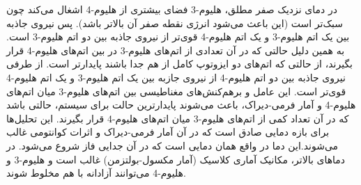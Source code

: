 \documentclass[12pt,a4paper]{article}
\begin{document}
	در دمای نزدیک صفر مطلق، هلیوم-3 فضای بیشتری از هلیوم-4 اشغال می‌کند چون سبک‌تر است (این باعث می‌شود انرژی نقطه صفر آن بالاتر باشد).
	پس نیروی جاذبه بین یک اتم هلیوم-3 و یک اتم هلیوم-4 قوی‌تر از نیروی جاذبه بین دو اتم هلیوم-3 است.
	به همین دلیل حالتی که در آن تعدادی از اتم‌های هلیوم-3 در بین اتم‌های هلیوم-4 قرار بگیرند، از حالتی که اتم‌های دو ایزوتوپ کامل از هم جدا باشند پایدارتر است.
	از طرفی نیروی جاذبه بین دو اتم هلیوم-4 از نیروی جازبه بین یک اتم هلیوم-3 و یک اتم هلیوم-4 قوی‌تر است. این عامل و برهم‌کنش‌های مغناطیسی بین اتم‌های هلیوم-3
	میان اتم‌های هلیوم-4 و آمار فرمی-دیراک، باعث می‌شوند پایدارترین حالت برای سیستم، حالتی باشد که در آن تعداد کمی از اتم‌های هلیوم-3 میان اتم‌های هلیوم-4 قرار بگیرند.
	این تحلیل‌ها برای بازه دمایی صادق است که در آن آمار فرمی-دیراک و اثرات کوانتومی غالب می‌شوند.این دما در واقع همان دمایی است که در آن جدایی فاز شروع می‌شود.
	در دما‌های بالاتر، مکانیک آماری کلاسیک (آمار مکسول-بولتزمن) غالب است و هلیوم-3 و هلیوم-4 می‌توانند آزادانه با هم مخلوط شوند.
\end{document}
